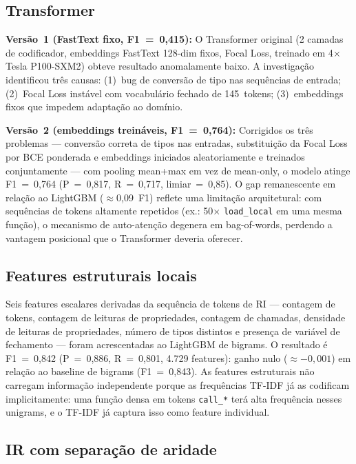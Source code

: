 \subsection{Transformer}
\label{sub:transformer}

\textbf{Versão~1 (FastText fixo, F1~=~0,415):} O Transformer original (2 camadas
de codificador, embeddings FastText 128-dim fixos, Focal Loss, treinado
em 4$\times$ Tesla P100-SXM2) obteve resultado anomalamente baixo. A investigação
identificou três causas: (1)~bug de conversão de tipo nas sequências de entrada;
(2)~Focal Loss instável com vocabulário fechado de 145~tokens; (3)~embeddings
fixos que impedem adaptação ao domínio.

\textbf{Versão~2 (embeddings treináveis, F1~=~0,764):} Corrigidos os três
problemas --- conversão correta de tipos nas entradas, substituição da Focal
Loss por BCE ponderada e embeddings iniciados aleatoriamente e treinados
conjuntamente --- com pooling mean+max em vez de mean-only, o modelo atinge
F1~=~0,764 (P~=~0,817, R~=~0,717, limiar~=~0,85). O gap remanescente em
relação ao LightGBM ($\approx$0,09~F1) reflete uma limitação arquitetural: com
sequências de tokens altamente repetidos (ex.: 50$\times$ \texttt{load\_local} em
uma mesma função), o mecanismo de auto-atenção degenera em bag-of-words,
perdendo a vantagem posicional que o Transformer deveria oferecer.

\subsection{Features estruturais locais}
\label{sub:estrutural}

Seis features escalares derivadas da sequência de tokens de RI — contagem de tokens,
contagem de leituras de propriedades, contagem de chamadas, densidade de leituras
de propriedades, número de tipos distintos e presença de variável de fechamento —
foram acrescentadas ao LightGBM de bigrams. O resultado é F1~=~0,842
(P~=~0,886, R~=~0,801, 4.729 features): ganho nulo ($\approx{-}0{,}001$) em relação
ao baseline de bigrams (F1~=~0,843).
As features estruturais não carregam informação independente porque as frequências
TF-IDF já as codificam implicitamente: uma função densa em tokens \texttt{call\_*}
terá alta frequência nesses unigrams, e o TF-IDF já captura isso como feature
individual.

\subsection{IR com separação de aridade}
\label{sub:aridade}

